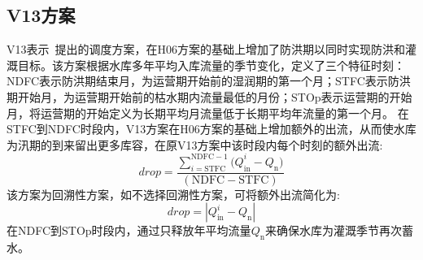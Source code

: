 \subsection{V13方案}
V13表示~\citet{voisin2013improved}提出的调度方案，在H06方案的基础上增加了防洪期以同时实现防洪和灌溉目标。该方案根据水库多年平均入库流量的季节变化，定义了三个特征时刻：NDFC表示防洪期结束月，为运营期开始前的湿润期的第一个月；STFC表示防洪期开始月，为运营期开始前的枯水期内流量最低的月份；STOp表示运营期的开始月，\citet{hanasaki2006reservoir}将运营期的开始定义为长期平均月流量低于长期平均年流量的第一个月。
在STFC到NDFC时段内，V13方案在H06方案的基础上增加额外的出流，从而使水库为汛期的到来留出更多库容，在原V13方案中该时段内每个时刻的额外出流:
\begin{equation}
  drop = \frac{\sum_{i = \text{STFC}}^{\text{NDFC} - 1}{{(Q}_{\text{in}}^{i} - Q_{\mathrm{n}})}}{\left( \text{NDFC} - \text{STFC} \right)}
\end{equation}
该方案为回溯性方案，如不选择回溯性方案，可将额外出流简化为:
\begin{equation}
  drop = \left| Q_{\text{in}}^{i} - Q_{\mathrm{n}} \right|
\end{equation}
在NDFC到STOp时段内，通过只释放年平均流量$Q_{\mathrm{n}}$来确保水库为灌溉季节再次蓄水。

